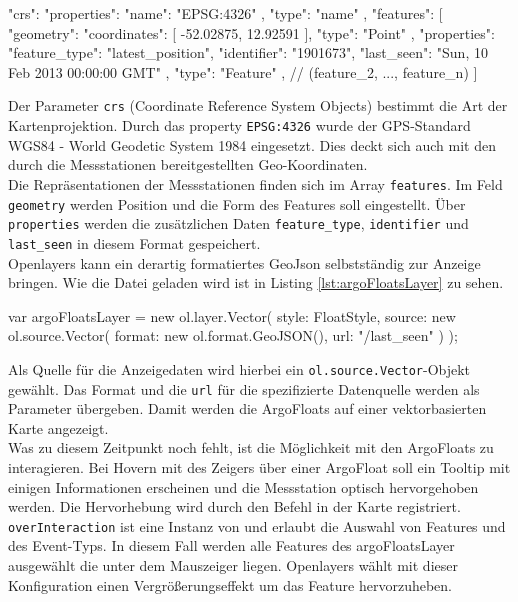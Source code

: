 \begin{javascript}[label={lst:argGeoJson}, caption={Gekürzte geoJSON zur Darstellung der Argo-Floats}]
 {
"crs": {
    "properties": {
      "name": "EPSG:4326"
    }, 
    "type": "name"
  }, 
  "features": [
    {
      "geometry": {
        "coordinates": [
          -52.02875, 
          12.92591
        ], 
        "type": "Point"
      }, 
      "properties": {
        "feature_type": "latest_position", 
        "identifier": "1901673", 
        "last_seen": "Sun, 10 Feb 2013 00:00:00 GMT"
      }, 
      "type": "Feature"
    },
    // (feature_2, ..., feature_n) 
    ]
}
\end{javascript}

Der Parameter \texttt{crs} (Coordinate Reference System Objects) bestimmt die Art der Kartenprojektion. Durch das property \texttt{EPSG:4326} wurde der GPS-Standard WGS84 - World Geodetic System 1984 eingesetzt. Dies deckt sich auch mit den durch die Messstationen bereitgestellten Geo-Koordinaten.
\\
Die Repräsentationen der Messstationen finden sich im Array \texttt{features}. Im Feld \texttt{geometry} werden Position und die Form des Features soll eingestellt. Über \texttt{properties} werden die zusätzlichen Daten \texttt{feature\_type}, \texttt{identifier} und \texttt{last\_seen} in diesem Format gespeichert. 
\\
Openlayers kann ein derartig formatiertes GeoJson selbstständig zur Anzeige bringen. Wie die Datei geladen wird ist in Listing \ref{lst:argoFloatsLayer} zu sehen.

\begin{javascript}[label={lst:argoFloatsLayer}, caption={Die Funktion argoFloatsLayer}]
var argoFloatsLayer = new ol.layer.Vector({
    style: FloatStyle,
    source: new ol.source.Vector({
        format: new ol.format.GeoJSON(),
        url: "/last_seen"
    })
});
\end{javascript}
Als Quelle für die Anzeigedaten wird hierbei ein \texttt{ol.source.Vector}-Objekt gewählt. Das Format und die \texttt{url} für die spezifizierte Datenquelle werden als Parameter übergeben.
Damit werden die ArgoFloats auf einer vektorbasierten Karte angezeigt.  
\\
Was zu diesem Zeitpunkt noch fehlt, ist die Möglichkeit mit den ArgoFloats zu interagieren. Bei Hovern mit des Zeigers über einer ArgoFloat soll ein Tooltip mit einigen Informationen erscheinen und die Messstation optisch hervorgehoben werden.  Die Hervorhebung wird durch den Befehl  in der Karte registriert. \texttt{overInteraction} ist eine Instanz von  und erlaubt die Auswahl von Features und des Event-Typs. In diesem Fall werden alle Features des argoFloatsLayer ausgewählt die unter dem Mauszeiger liegen. Openlayers wählt mit dieser Konfiguration einen Vergrößerungseffekt um das Feature hervorzuheben.

